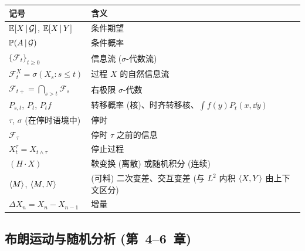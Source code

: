 \begin{center}
\small\renewcommand{\arraystretch}{1.1}
\begin{tabular}{>{\raggedright\arraybackslash}p{} >{\raggedright\arraybackslash}p{}}
\toprule
\textbf{记号} & \textbf{含义} \\
\midrule
$\E[X\,|\,\mathcal{G}]$, $\E[X\,|\,Y]$ & 条件期望 \\
$\P(A\,|\,\mathcal{G})$ & 条件概率 \\
$\{\mathcal{F}_t\}_{t\ge 0}$ & 信息流 ($\sigma$-代数流) \\
$\mathcal{F}^X_t=\sigma(X_s:s\le t)$ & 过程 $X$ 的自然信息流 \\
$\mathcal{F}_{t+}=\bigcap_{s>t}\mathcal{F}_s$ & 右极限 $\sigma$-代数 \\
$P_{s,t}$, $P_t$, $P_tf$ & 转移概率 (核)、时齐转移核、$\int f(y)P_t(x,\dd y)$ \\
$\tau$, $\sigma$ (在停时语境中) & 停时 \\
$\mathcal{F}_\tau$ & 停时 $\tau$ 之前的信息 \\
$X^\tau_t=X_{t\wedge\tau}$ & 停止过程 \\
$(H\cdot X)$ & 鞅变换 (离散) 或随机积分 (连续) \\
$\ip{M}$, $\ip{M,N}$ & (可料) 二次变差、交互变差 (与 $L^2$ 内积 $\ip{X,Y}$ 由上下文区分) \\
$\Delta X_n=X_n-X_{n-1}$ & 增量 \\
\bottomrule
\end{tabular}
\end{center}

\subsection*{布朗运动与随机分析 (第~4--6~章)}


